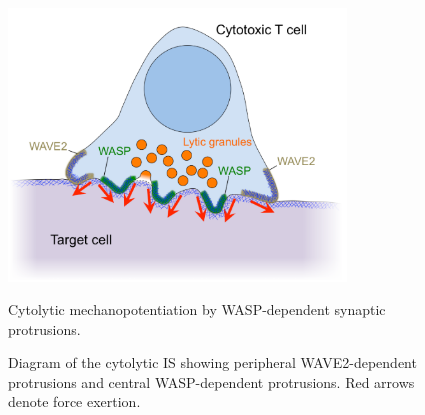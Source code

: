 \begin{figure}[htbp]
	\centering
	\includegraphics[width=0.8\textwidth]{../figures/chapter2/fig8model.png}
	\caption{Cytolytic mechanopotentiation by WASP-dependent synaptic protrusions.}
	\caption*{Diagram of the cytolytic IS showing peripheral WAVE2-dependent protrusions and central WASP-dependent protrusions. Red arrows denote force exertion.}
	\label{fig:fig8model}
\end{figure}

